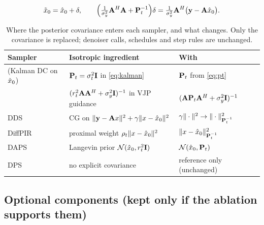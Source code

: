 
\begin{equation}
  \tilde x_0=\hat{x}_0+\delta,\qquad
  \Bigl(\tfrac{1}{\sigma_y^2}\mathbf{A}^{H}\mathbf{A}+\mathbf{P}_t^{-1}\Bigr)\delta
  =\tfrac{1}{\sigma_y^2}\mathbf{A}^{H}\bigl(\mathbf{y}-\mathbf{A}\hat{x}_0\bigr).
  \label{eq:cg}
\end{equation}

\begin{table}[t]
{\caption{Where the posterior covariance enters each sampler, and what \method{}
changes. Only the covariance is replaced; denoiser calls, schedules and step rules
are unchanged.}}
{\small\setlength{\tabcolsep}{4pt}
\begin{tabular}{@{}lll@{}}
\toprule
Sampler & Isotropic ingredient & With \method{}\\
\midrule
\ikdc{} (Kalman DC on $\hat{x}_0$) & $\mathbf{P}_t=\sigma_t^2\mathbf{I}$ in \eqref{eq:kalman} & $\mathbf{P}_t$ from \eqref{eq:pt}\\
\pigdm{} \citep{song2023pigdm} & $(r_t^2\mathbf{A}\mathbf{A}^H+\sigma_y^2\mathbf{I})^{-1}$ in VJP guidance & $(\mathbf{A}\mathbf{P}_t\mathbf{A}^H+\sigma_y^2\mathbf{I})^{-1}$\\
DDS \citep{chung2024dds} & CG on $\|\mathbf{y}-\mathbf{A} x\|^2+\gamma\|x-\hat{x}_0\|^2$ & $\gamma\|\cdot\|^2\to\|\cdot\|^2_{\mathbf{P}_t^{-1}}$\\
DiffPIR \citep{zhu2023diffpir} & proximal weight $\rho_t\|x-\hat{x}_0\|^2$ & $\|x-\hat{x}_0\|^2_{\mathbf{P}_t^{-1}}$\\
DAPS \citep{zhang2025daps} & Langevin prior $\mathcal{N}(\hat{x}_0,r_t^2\mathbf{I})$ & $\mathcal{N}(\hat{x}_0,\mathbf{P}_t)$\\
DPS \citep{chung2023dps} & no explicit covariance & reference only (unchanged)\\
\bottomrule
\end{tabular}}
\end{table}

\subsection{Optional components (kept only if the ablation supports them)}
\label{sec:optional}

